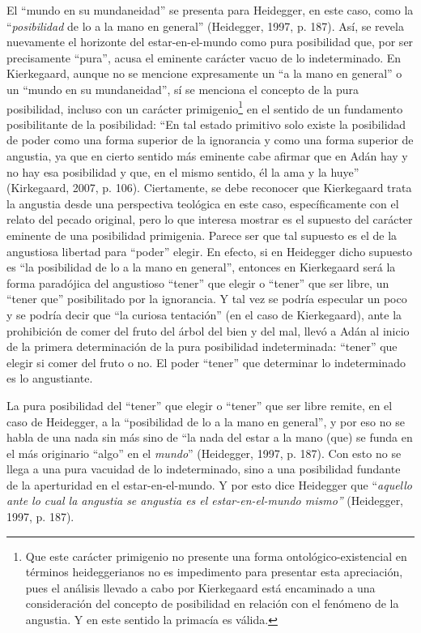 \documentclass[]{article}
\begin{document}
El ``mundo en su mundaneidad'' se presenta para Heidegger, en este caso, como la ``\emph{posibilidad} de lo a la mano en general'' (Heidegger, 1997, p. 187). Así, se revela nuevamente el horizonte del estar-en-el-mundo como pura posibilidad que, por ser precisamente ``pura'', acusa el eminente carácter vacuo de lo indeterminado. En Kierkegaard, aunque no se mencione expresamente un ``a la mano en general'' o un ``mundo en su mundaneidad'', sí se menciona el concepto de la pura posibilidad, incluso con un carácter primigenio\footnote{Que este carácter primigenio no presente una forma ontológico-existencial en términos heideggerianos no es impedimento para presentar esta apreciación, pues el análisis llevado a cabo por Kierkegaard está encaminado a una consideración del concepto de posibilidad en relación con el fenómeno de la angustia. Y en este sentido la primacía es válida.} en el sentido de un fundamento posibilitante de la posibilidad: ``En tal estado primitivo solo existe la posibilidad de poder como una forma superior de la ignorancia y como una forma superior de angustia, ya que en cierto sentido más eminente cabe afirmar que en Adán hay y no hay esa posibilidad y que, en el mismo sentido, él la ama y la huye'' (Kirkegaard, 2007, p. 106). Ciertamente, se debe reconocer que Kierkegaard trata la angustia desde una perspectiva teológica en este caso, específicamente con el relato del pecado original, pero lo que interesa mostrar es el supuesto del carácter eminente de una posibilidad primigenia. Parece ser que tal supuesto es el de la angustiosa libertad para ``poder'' elegir. En efecto, si en Heidegger dicho supuesto es ``la posibilidad de lo a la mano en general'', entonces en Kierkegaard será la forma paradójica del angustioso ``tener'' que elegir o ``tener'' que ser libre, un ``tener que'' posibilitado por la ignorancia. Y tal vez se podría especular un poco y se podría decir que ``la curiosa tentación'' (en el caso de Kierkegaard), ante la prohibición de comer del fruto del árbol del bien y del mal, llevó a Adán al inicio de la primera determinación de la pura posibilidad indeterminada: ``tener'' que elegir si comer del fruto o no. El poder ``tener'' que determinar lo indeterminado es lo angustiante.

La pura posibilidad del ``tener'' que elegir o ``tener'' que ser libre remite, en el caso de Heidegger, a la ``posibilidad de lo a la mano en general'', y por eso no se habla de una nada sin más sino de ``la nada del estar a la mano (que) se funda en el más originario ``algo'' en el \emph{mundo}'' (Heidegger, 1997, p. 187). Con esto no se llega a una pura vacuidad de lo indeterminado, sino a una posibilidad fundante de la aperturidad en el estar-en-el-mundo. Y por esto dice Heidegger que ``\emph{aquello ante lo cual la angustia se angustia es el estar-en-el-mundo mismo''} (Heidegger, 1997, p. 187).
\end{document}
